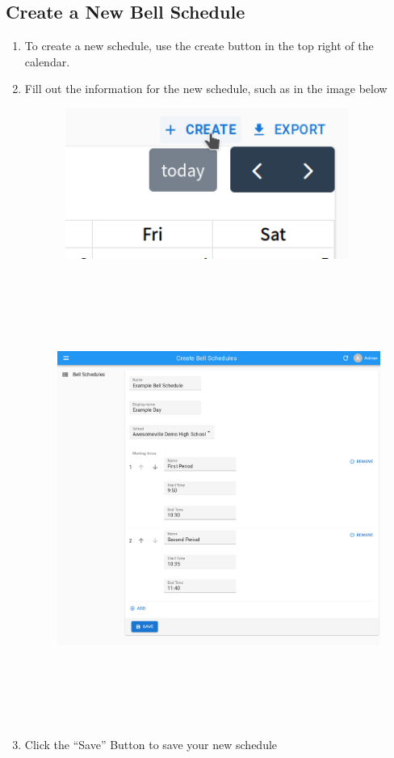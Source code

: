 \documentclass{article}
\begin{document}
\subsection{Create a New Bell Schedule}
\begin{enumerate}
\item {
To create a new schedule, use the create button in the top right of the calendar.}
\item {
Fill out the information for the new schedule, such as in the image below}
\begin{figure}
\includegraphics[width=3.8693in,height=1.9382in]{Mini20Manual-img010.png}\end{figure}
\begin{figure}
\includegraphics[width=6.5in,height=5.7717in]{Mini20Manual-img011.png}\end{figure}
\item {
Click the “Save” Button to save your new schedule}
\end{enumerate}
\end{document}

